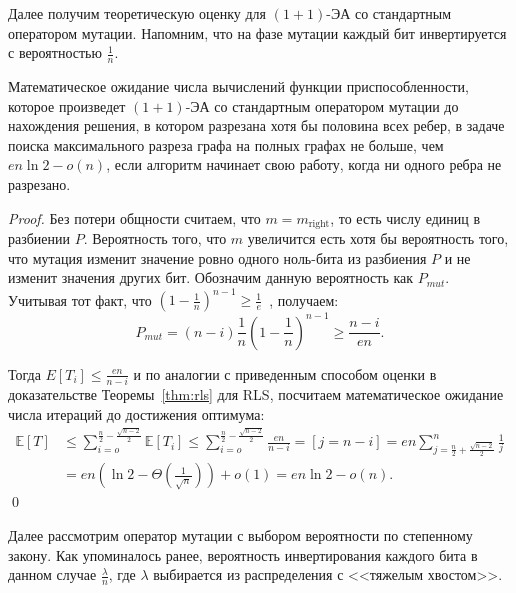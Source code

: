 \documentclass[times]{itmo-student-thesis}
\newcommand{\oea}{\mbox{$(1 + 1)$-ЭА}\xspace}
\begin{document}
Далее получим теоретическую оценку для \oea со стандартным оператором мутации. Напомним, что  на фазе мутации каждый бит инвертируется с вероятностью $\frac{1}{n}$.

\begin{theorem} \label{thm:one}
  Математическое ожидание числа вычислений функции приспособленности, которое произведет \oea со стандартным оператором мутации до нахождения решения, в котором разрезана хотя бы половина всех ребер, в задаче поиска максимального разреза графа на полных графах не больше, чем $en\ln 2 - o(n)$, если алгоритм начинает свою работу, когда ни одного ребра не разрезано.
\end{theorem}

\begin{proof}
  Без потери общности считаем, что $m = m_{\text{right}}$, то есть числу единиц в разбиении $P$. Вероятность того, что $m$ увеличится есть хотя бы вероятность того, что мутация изменит значение ровно одного ноль-бита из разбиения $P$ и не изменит значения других бит. Обозначим данную вероятность как $P_{mut}$.
  Учитывая тот факт, что
  $ (1 - \frac{1}{n})^{n-1} \ge \frac{1}{e}$~\cite{DoerrDE15},
  получаем:
  $$
    P_{mut} = (n-i)\frac{1}{n}\left(1 - \frac{1}{n}\right)^{n-1} \ge \frac{n-i}{en}.
  $$

  Тогда $E[T_i] \leq \frac{en}{n-i}$ и по аналогии с приведенным способом оценки в доказательстве Теоремы~\ref{thm:rls} для RLS, посчитаем математическое ожидание числа итераций до достижения оптимума:
  \begin{align*}
    \mathbb{E}[T] &\le
                \sum_{i=o}^{\frac{n}{2} - \frac{\sqrt{n-2}}{2}} \mathbb{E}[T_i] \leq
                \sum_{i=o}^{\frac{n}{2} - \frac{\sqrt{n-2}}{2}} \frac{en}{n-i} = [j = n - i] = en \sum_{j=\frac{n}{2} + \frac{\sqrt{n-2}}{2}}^{n} \frac{1}{j}  \\
        &=
                en\left(\ln2 - \Theta\left(\frac{1}{\sqrt{n}}\right)\right) + o(1) = en \ln2 - o(n).
  \end{align*}
  \qed
\end{proof}


Далее рассмотрим оператор мутации с выбором вероятности по степенному закону. Как упоминалось ранее, вероятность инвертирования каждого бита в данном случае $\frac{\lambda}{n}$, где $\lambda$ выбирается из распределения с <<тяжелым хвостом>>.
\end{document}

